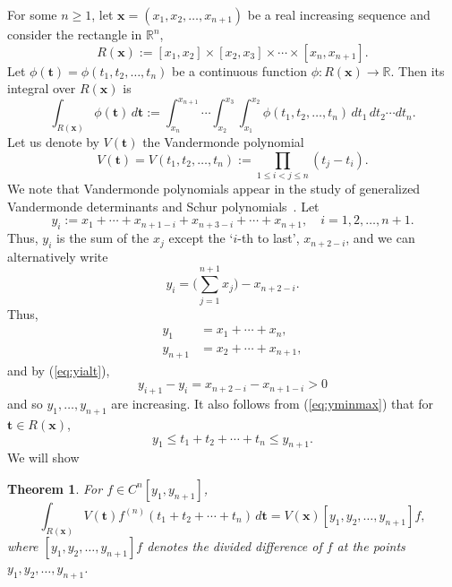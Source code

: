 \documentclass[12pt]{article}
\newcommand{\RR}{\mathbb{R}}
\def\bft{\mathbf{t}}
\def\bfx{\mathbf{x}}
\newtheorem{theorem}{Theorem}
\begin{document}
For some $n \ge 1$, let $\bfx = (x_1,x_2,\ldots,x_{n+1})$ be a real increasing
sequence and consider the rectangle in $\RR^n$,
\begin{equation}\label{eq:seq_rect}
 R(\bfx) := [x_1,x_2] \times [x_2,x_3] \times \cdots 
	     \times [x_n,x_{n+1}].
\end{equation}
Let $\phi(\bft) = \phi(t_1,t_2,\ldots,t_n)$ be a 
continuous function $\phi : R(\bfx) \to \RR$. Then its integral
over $R(\bfx)$
is
$$ \int_{R(\bfx)} \phi(\bft) \, d\bft
 := \int_{x_n}^{x_{n+1}} \cdots \int_{x_2}^{x_3} \int_{x_1}^{x_2}
 \phi(t_1,t_2,\ldots,t_n) \, dt_1 \, dt_2 \cdots dt_n. $$
Let us denote by $V(\bft)$ the Vandermonde polynomial
\begin{equation}\label{eq:vandpoly}
V(\bft) = V(t_1,t_2,\ldots,t_n) := \prod_{1 \le i < j \le n} (t_j-t_i).
\end{equation}
We note that Vandermonde polynomials
appear in the study of generalized Vandermonde
determinants and Schur
polynomials~\cite{Macdonald:1995,deMarchi:2001,Ait-Haddou:2019}.
Let
\begin{equation}\label{eq:yidef}
y_i := x_1 + \cdots + x_{n+1-i} + x_{n+3-i} + \cdots + x_{n+1},
\quad i=1,2,\ldots,n+1.
\end{equation}
Thus, $y_i$ is the sum of the $x_j$ except the `$i$-th to last',
$x_{n+2-i}$,
and we can alternatively write
\begin{equation}\label{eq:yialt}
y_i = \Big(\sum_{j=1}^{n+1} x_j \Big) - x_{n+2-i}.
\end{equation}
Thus,
\begin{equation}\label{eq:yminmax}
\begin{aligned}
y_1 &= x_1 + \cdots + x_n, \\
y_{n+1} &= x_2 + \cdots + x_{n+1},
\end{aligned}
\end{equation}
and by (\ref{eq:yialt}),
$$ y_{i+1} - y_i = x_{n+2-i} - x_{n+1-i} > 0 $$
and so $y_1,\ldots,y_{n+1}$ are increasing.
It also follows from (\ref{eq:yminmax}) that for $\bft \in R(\bfx)$,
\begin{equation}\label{eq:tsumbound}
 y_1 \le t_1 + t_2 + \cdots + t_n \le y_{n+1}.
\end{equation}
We will show
\begin{theorem}\label{thm:ddid}
	For $f \in C^n[y_1,y_{n+1}]$,
\begin{equation}\label{eq:ddid}
\int_{R(\bfx)} V(\bft) f^{(n)}(t_1 + t_2 + \cdots + t_n)\, d\bft
	= V(\bfx) [y_1,y_2,\ldots,y_{n+1}]f,
\end{equation}
where
$[y_1,y_2,\ldots,y_{n+1}]f$ denotes the divided difference
of $f$ at the points $y_1,y_2,\ldots,y_{n+1}$.
\end{theorem}
\end{document}
